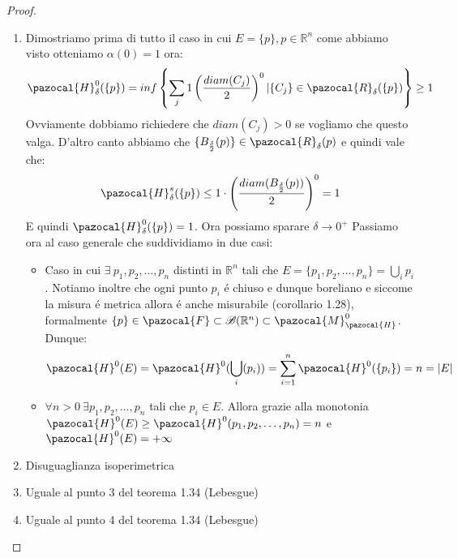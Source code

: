 \documentclass[11pt,a4paper]{report}
\theoremstyle{plain}
\theoremstyle{definition}
\newcommand{\F}{\pazocal{F}}
\newcommand{\Ha}{\pazocal{H}_\delta}
\newcommand{\Hu}{\pazocal{H}}
\newcommand{\B}{\mathcal{B}}
\begin{document}
\begin{proof}
	\begin{enumerate}
		\item Dimostriamo prima di tutto il caso in cui $E = \{p\}, p \in \mathbb{R}^n$ come abbiamo visto otteniamo $\alpha(0) = 1$ ora:
		\[
			\Ha^0(\{p\}) = inf\left\{\sum\limits_j 1 \left(\frac{diam(C_j)}{2}\right)^0 | \{C_j\} \in  \pazocal{R}_\delta(\{p\})\right\}	\ge 1
		\]
		Ovviamente dobbiamo richiedere che $diam(C_j) > 0$ se vogliamo che questo valga. D'altro canto abbiamo che $\{B_\frac{\delta}{2}({p})\} \in \pazocal{R}_\delta({p})$ e quindi vale che:
		\[
			\Ha^s(\{p\}) \le 1 \cdot \left(\frac{diam(B_\frac{\delta}{2}({p}))}{2}\right)^0 = 1		
		\]
		E quindi $\Ha^0(\{p\}) = 1$. Ora possiamo sparare $\delta \rightarrow 0^+$
		Passiamo ora al caso generale che suddividiamo in due casi:
		\begin{itemize}
			\item Caso in cui $\exists\ p_1,p_2,\ldots,p_n$ distinti in $\mathbb{R}^n$ tali che $E = \{p_1,p_2,\ldots,p_n\} = \bigcup\limits_i{p_i}$. Notiamo inoltre che ogni punto $p_i$ \'e chiuso e dunque boreliano e siccome la misura \'e metrica allora \'e anche misurabile (corollario 1.28), formalmente $\{p\} \in \F \subset \B(\mathbb{R}^n) \subset \pazocal{M}_\pazocal{H}^0$. Dunque:
			\[
				\Hu^0(E) = \Hu^0(\bigcup\limits_i({p_i})) = \sum\limits_{i = 1}^n \Hu^0(\{p_i\}) = n = |E|		
			\]
			\item $\forall n > 0\ \exists p_1,p_2,\ldots,p_n$ tali che $p_i \in E$. Allora grazie alla monotonia $\Hu^0(E) \ge \Hu^0({p_1,p_2,\ldots,p_n}) = n$ e $\Hu^0(E) = +\infty$
		\end{itemize}
		\item Disuguaglianza isoperimetrica
		\item Uguale al punto 3 del teorema 1.34 (Lebesgue)
		\item Uguale al punto 4 del teorema 1.34 (Lebesgue)
	\end{enumerate}
\end{proof}
\end{document}
